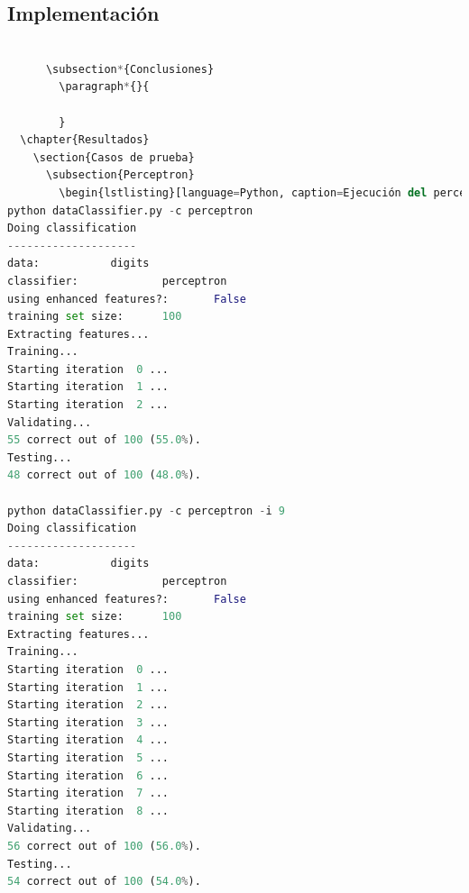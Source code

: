 \documentclass{report}
\begin{document}
      \subsection*{Implementación}
        \begin{lstlisting}[language=Python, caption=Implementación del clonador de comportamiento del pacman con rasgos diseñados por nosotros]
          
      \subsection*{Conclusiones}
        \paragraph*{}{

        }
  \chapter{Resultados}
    \section{Casos de prueba}
      \subsection{Perceptron}
        \begin{lstlisting}[language=Python, caption=Ejecución del perceptron]
python dataClassifier.py -c perceptron
Doing classification
--------------------
data:           digits
classifier:             perceptron
using enhanced features?:       False
training set size:      100
Extracting features...
Training...
Starting iteration  0 ...
Starting iteration  1 ...
Starting iteration  2 ...
Validating...
55 correct out of 100 (55.0%).
Testing...
48 correct out of 100 (48.0%).

python dataClassifier.py -c perceptron -i 9  
Doing classification
--------------------
data:           digits
classifier:             perceptron
using enhanced features?:       False
training set size:      100
Extracting features...
Training...
Starting iteration  0 ...
Starting iteration  1 ...
Starting iteration  2 ...
Starting iteration  3 ...
Starting iteration  4 ...
Starting iteration  5 ...
Starting iteration  6 ...
Starting iteration  7 ...
Starting iteration  8 ...
Validating...
56 correct out of 100 (56.0%).
Testing...
54 correct out of 100 (54.0%).
        \end{lstlisting}
\end{document}
